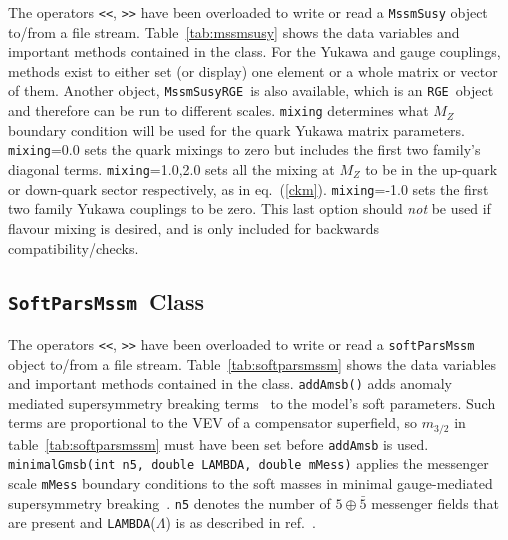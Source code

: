 \documentclass{article}
\def\code#1{\small{\tt #1}\normalsize}
\begin{document}
%
The operators \code{<<}, \code{>>} have been overloaded to write or read a
\code{MssmSusy} object to/from a file stream. Table~\ref{tab:mssmsusy} shows
the data variables and important methods contained in the class. For the
Yukawa and gauge couplings, methods exist to either set (or display) one
element or a whole matrix or vector of them.
Another object, \code{MssmSusyRGE}~is also available, which is an
\code{RGE}~object and therefore can be run to different scales.
\code{mixing} determines what $M_Z$ boundary condition will be used for the
quark Yukawa matrix parameters.
\code{mixing}=0.0 sets the quark mixings to zero but includes the first two 
family's diagonal terms.
\code{mixing}=1.0,2.0 sets all the mixing at $M_Z$
to be in the up-quark or down-quark
sector respectively, as in eq.~(\ref{ckm}).
\code{mixing}=-1.0 sets the first two family Yukawa couplings to be zero. This
last option should {\em not}\/ be used if flavour mixing is desired, and is
only included for backwards compatibility/checks.

\subsection{\code{SoftParsMssm}~Class\label{sec:softie}}
The operators \code{<<}, \code{>>} have been overloaded to write or read a
\code{softParsMssm} object to/from a file stream. 
Table~\ref{tab:softparsmssm} shows
the data variables and important methods contained in the class.
\code{addAmsb()} adds anomaly mediated supersymmetry breaking
terms~\cite{Randall:1998uk} to 
the model's soft parameters. Such terms are proportional to the VEV of a
compensator superfield, so $m_{3/2}$ in table~\ref{tab:softparsmssm} must have
been set before \code{addAmsb} is used. 
\code{minimalGmsb(int n5, double LAMBDA, double mMess)} applies the messenger
scale \code{mMess} boundary conditions to the soft masses in minimal
gauge-mediated supersymmetry breaking~\cite{gmsb}. \code{n5} denotes the
number of $5\oplus \bar 5$ messenger fields that are present and
\code{LAMBDA}($\Lambda$) is as described in ref.~\cite{gmsb}. 
\end{document}
